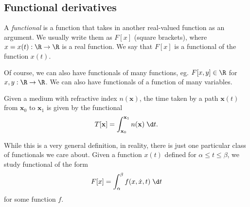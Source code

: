 \documentclass[a4paper]{article}
\begin{document}
\subsection{Functional derivatives}
\begin{defi}[Functional]
  A \emph{functional} is a function that takes in another real-valued function as an argument. We usually write them as $F[x]$ (square brackets), where $x = x(t): \R \to \R$ is a real function. We say that $F[x]$ is a functional of the function $x(t)$.
\end{defi}
Of course, we can also have functionals of many functions, eg. $F[x, y]\in \R$ for $x, y: \R \to \R$. We can also have functionals of a function of many variables.

\begin{eg}
  Given a medium with refractive index $n(\mathbf{x})$, the time taken by a path $\mathbf{x}(t)$ from $\mathbf{x}_0$ to $\mathbf{x}_1$ is given by the functional
  \[
    T[\mathbf{x}] = \int_{\mathbf{x}_0}^{\mathbf{x}_1} n(\mathbf{x}) \;\d t.
  \]
\end{eg}

While this is a very general definition, in reality, there is just one particular class of functionals we care about. Given a function $x(t)$ defined for $\alpha \leq t \leq \beta$, we study functional of the form
\[
  F[x]  = \int_\alpha^\beta f(x, \dot{x}, t)\;\d t
\]
for some function $f$.
\end{document}
